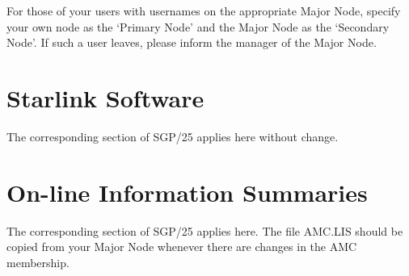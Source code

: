 For those of your users with usernames on the appropriate Major Node, specify
your own node as the `Primary Node' and the Major Node as the `Secondary Node'.
If such a user leaves, please inform the manager of the Major Node.

\section {Starlink Software}

The corresponding section of SGP/25 applies here without change.

\section {On-line Information Summaries}

The corresponding section of SGP/25 applies here.
The file AMC.LIS should be copied from your Major Node whenever there are
changes in the AMC membership.

